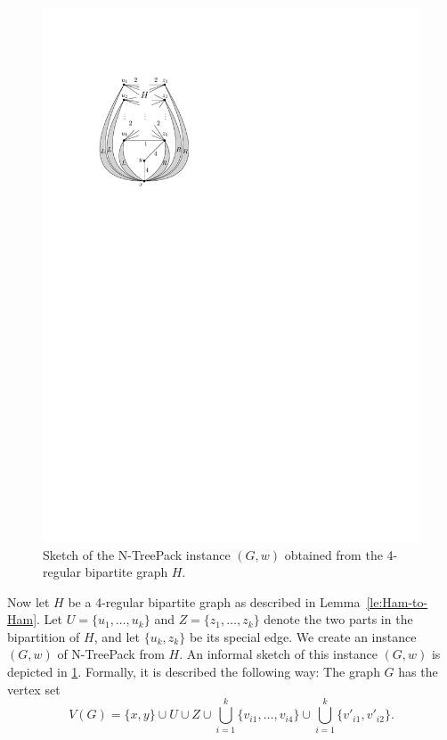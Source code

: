 \documentclass[runningheads]{llncs}
\newcommand{\set}[1]{\{ #1 \}}
\newcommand{\fromto}[2]{\set{#1, \ldots, #2}}
\newcommand{\xxxNTP}{{\sc N-TreePack}}
\begin{document}
\begin{figure}[htpb]
\centering
 \includegraphics[scale=1.1]{act-hamilton-cycle-a}
\caption{Sketch of the {\xxxNTP} instance $(G, w)$ obtained from the 4-regular bipartite graph $H$.}
\label{fig:reduction-overview}
\end{figure}
Now let $H$ be a 4-regular bipartite graph as described in Lemma~\ref{le:Ham-to-Ham}.
Let $U=\fromto{u_1}{u_k}$ and $Z=\fromto{z_1}{z_k}$ denote the two parts in the bipartition of $H$, 
and let $\{u_k,z_k\}$ be its special edge.
We create an instance $(G,w)$ of {\xxxNTP} from $H$. An informal sketch of this instance $(G,w)$ is depicted in \cref{fig:reduction-overview}. Formally, it is described the following way:
The graph $G$ has the vertex set 
\[ 
V(G) =  \set{x, y} \cup U \cup Z 
        \cup \bigcup_{i=1}^k \fromto{v_{i1}}{v_{i4}} \cup \bigcup_{i=1}^k \set{v'_{i1}, v'_{i2}}.
\]
\end{document}
